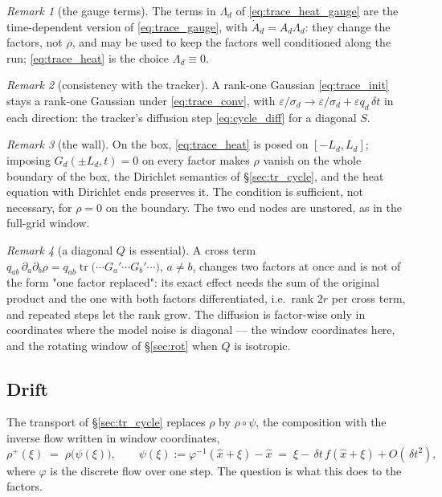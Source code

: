 \documentclass[11pt,a4paper]{article}
\newcommand{\tr}{\operatorname{tr}}
\newcommand{\xh}{\hat{x}}
\newcommand{\eps}{\varepsilon}
\newcommand{\dt}{\,\delta t}
\theoremstyle{plain}
\theoremstyle{definition}
\theoremstyle{remark}
\newtheorem{remark}{Remark}
\begin{document}
\begin{remark}[the gauge terms]
The terms in $\Lambda_d$ of \eqref{eq:trace_heat_gauge} are the time-dependent version of \eqref{eq:trace_gauge}, with $\dot A_d = A_d\Lambda_d$: they change the factors, not $\rho$, and may be used to keep the factors well conditioned along the run; \eqref{eq:trace_heat} is the choice $\Lambda_d\equiv0$.
\end{remark}

\begin{remark}[consistency with the tracker]
A rank-one Gaussian \eqref{eq:trace_init} stays a rank-one Gaussian under \eqref{eq:trace_conv}, with $\eps/\sigma_d\to\eps/\sigma_d+\eps q_d\dt$ in each direction: the tracker's diffusion step \eqref{eq:cycle_diff} for a diagonal $S$.
\end{remark}

\begin{remark}[the wall]
On the box, \eqref{eq:trace_heat} is posed on $[-L_d,L_d]$; imposing $G_d(\pm L_d,t)=0$ on every factor makes $\rho$ vanish on the whole boundary of the box, the Dirichlet semantics of \S\ref{sec:tr_cycle}, and the heat equation with Dirichlet ends preserves it. The condition is sufficient, not necessary, for $\rho=0$ on the boundary. The two end nodes are unstored, as in the full-grid window.
\end{remark}

\begin{remark}[a diagonal $Q$ is essential]
A cross term $q_{ab}\,\partial_a\partial_b\rho = q_{ab}\tr\big(\cdots G_a'\cdots G_b'\cdots\big)$, $a\ne b$, changes two factors at once and is not of the form "one factor replaced": its exact effect needs the sum of the original product and the one with both factors differentiated, i.e.\ rank $2r$ per cross term, and repeated steps let the rank grow. The diffusion is factor-wise only in coordinates where the model noise is diagonal --- the window coordinates here, and the rotating window of \S\ref{sec:rot} when $Q$ is isotropic.
\end{remark}

\subsection{Drift}
\label{sec:trace_drift}

The transport of \S\ref{sec:tr_cycle} replaces $\rho$ by $\rho\circ\psi$, the composition with the inverse flow written in window coordinates,
\begin{equation}
  \rho^+(\xi) \;=\; \rho\big(\psi(\xi)\big), \qquad \psi(\xi) := \varphi^{-1}(\xh+\xi)-\xh \;=\; \xi - \dt\,f(\xh+\xi) + O(\dt^2),
  \label{eq:trace_psi}
\end{equation}
where $\varphi$ is the discrete flow over one step. The question is what this does to the factors.
\end{document}
